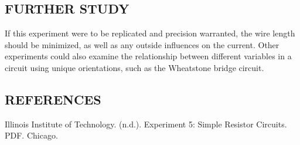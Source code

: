 \documentclass [12pt, letterpaper, twoside] {article}
\begin{document}
\subsection* {FURTHER STUDY}
If this experiment were to be replicated and precision warranted, the wire length should be minimized, as well as any outside influences on the current. Other experiments could also examine the relationship between different variables in a circuit using unique orientations, such as the Wheatstone bridge circuit.

\subsection* {REFERENCES}
Illinois Institute of Technology. (n.d.). Experiment 5: Simple Resistor Circuits. PDF. Chicago.
\end{document}
